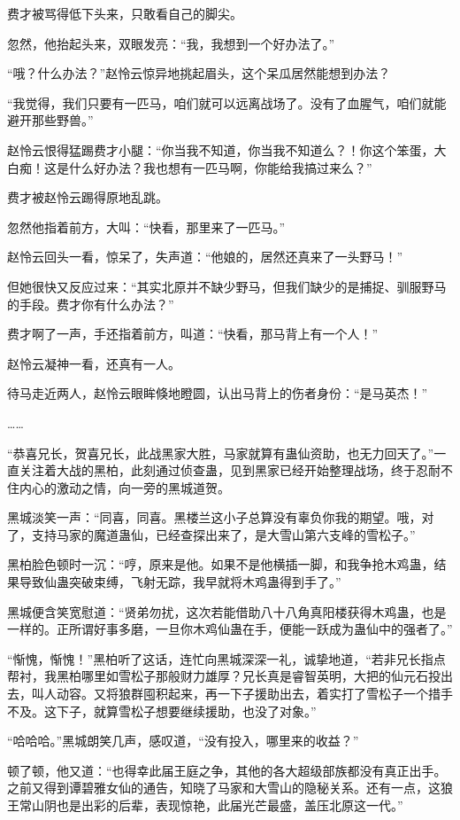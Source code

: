 \begin{this_body}
费才被骂得低下头来，只敢看自己的脚尖。

忽然，他抬起头来，双眼发亮：“我，我想到一个好办法了。”

“哦？什么办法？”赵怜云惊异地挑起眉头，这个呆瓜居然能想到办法？

“我觉得，我们只要有一匹马，咱们就可以远离战场了。没有了血腥气，咱们就能避开那些野兽。”

赵怜云恨得猛踢费才小腿：“你当我不知道，你当我不知道么？！你这个笨蛋，大白痴！这是什么好办法？我也想有一匹马啊，你能给我搞过来么？”

费才被赵怜云踢得原地乱跳。

忽然他指着前方，大叫：“快看，那里来了一匹马。”

赵怜云回头一看，惊呆了，失声道：“他娘的，居然还真来了一头野马！”

但她很快又反应过来：“其实北原并不缺少野马，但我们缺少的是捕捉、驯服野马的手段。费才你有什么办法？”

费才啊了一声，手还指着前方，叫道：“快看，那马背上有一个人！”

赵怜云凝神一看，还真有一人。

待马走近两人，赵怜云眼眸倏地瞪圆，认出马背上的伤者身份：“是马英杰！”

……

“恭喜兄长，贺喜兄长，此战黑家大胜，马家就算有蛊仙资助，也无力回天了。”一直关注着大战的黑柏，此刻通过侦查蛊，见到黑家已经开始整理战场，终于忍耐不住内心的激动之情，向一旁的黑城道贺。

黑城淡笑一声：“同喜，同喜。黑楼兰这小子总算没有辜负你我的期望。哦，对了，支持马家的魔道蛊仙，已经查探出来了，是大雪山第六支峰的雪松子。”

黑柏脸色顿时一沉：“哼，原来是他。如果不是他横插一脚，和我争抢木鸡蛊，结果导致仙蛊突破束缚，飞射无踪，我早就将木鸡蛊得到手了。”

黑城便含笑宽慰道：“贤弟勿扰，这次若能借助八十八角真阳楼获得木鸡蛊，也是一样的。正所谓好事多磨，一旦你木鸡仙蛊在手，便能一跃成为蛊仙中的强者了。”

“惭愧，惭愧！”黑柏听了这话，连忙向黑城深深一礼，诚挚地道，“若非兄长指点帮衬，我黑柏哪里如雪松子那般财力雄厚？兄长真是睿智英明，大把的仙元石投出去，叫人动容。又将狼群囤积起来，再一下子援助出去，着实打了雪松子一个措手不及。这下子，就算雪松子想要继续援助，也没了对象。”

“哈哈哈。”黑城朗笑几声，感叹道，“没有投入，哪里来的收益？”

顿了顿，他又道：“也得幸此届王庭之争，其他的各大超级部族都没有真正出手。之前又得到谭碧雅女仙的通告，知晓了马家和大雪山的隐秘关系。还有一点，这狼王常山阴也是出彩的后辈，表现惊艳，此届光芒最盛，盖压北原这一代。”


\end{this_body}
